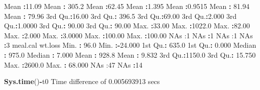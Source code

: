 \documentclass[
]{article}
\newenvironment{Shaded}{\begin{snugshade}}{\end{snugshade}}
\newcommand{\DecValTok}[1]{\textcolor[rgb]{0.00,0.00,0.81}{#1}}
\newcommand{\FloatTok}[1]{\textcolor[rgb]{0.00,0.00,0.81}{#1}}
\newcommand{\FunctionTok}[1]{\textcolor[rgb]{0.13,0.29,0.53}{\textbf{#1}}}
\newcommand{\NormalTok}[1]{#1}
\newcommand{\SpecialCharTok}[1]{\textcolor[rgb]{0.81,0.36,0.00}{\textbf{#1}}}
\newcommand{\StringTok}[1]{\textcolor[rgb]{0.31,0.60,0.02}{#1}}
\begin{document}
\begin{Shaded}
\begin{Highlighting}[]
\NormalTok{ Mean   }\SpecialCharTok{:}\FloatTok{11.09}\NormalTok{   Mean   }\SpecialCharTok{:} \FloatTok{305.2}\NormalTok{   Mean   }\SpecialCharTok{:}\FloatTok{62.45}\NormalTok{   Mean   }\SpecialCharTok{:}\FloatTok{1.395}\NormalTok{   Mean   }\SpecialCharTok{:}\FloatTok{0.9515}\NormalTok{   Mean   }\SpecialCharTok{:} \FloatTok{81.94}\NormalTok{   Mean   }\SpecialCharTok{:} \FloatTok{79.96}  
\NormalTok{ 3rd Qu.}\SpecialCharTok{:}\FloatTok{16.00}\NormalTok{   3rd Qu.}\SpecialCharTok{:} \FloatTok{396.5}\NormalTok{   3rd Qu.}\SpecialCharTok{:}\FloatTok{69.00}\NormalTok{   3rd Qu.}\SpecialCharTok{:}\FloatTok{2.000}\NormalTok{   3rd Qu.}\SpecialCharTok{:}\FloatTok{1.0000}\NormalTok{   3rd Qu.}\SpecialCharTok{:} \FloatTok{90.00}\NormalTok{   3rd Qu.}\SpecialCharTok{:} \FloatTok{90.00}  
\NormalTok{ Max.   }\SpecialCharTok{:}\FloatTok{33.00}\NormalTok{   Max.   }\SpecialCharTok{:}\FloatTok{1022.0}\NormalTok{   Max.   }\SpecialCharTok{:}\FloatTok{82.00}\NormalTok{   Max.   }\SpecialCharTok{:}\FloatTok{2.000}\NormalTok{   Max.   }\SpecialCharTok{:}\FloatTok{3.0000}\NormalTok{   Max.   }\SpecialCharTok{:}\FloatTok{100.00}\NormalTok{   Max.   }\SpecialCharTok{:}\FloatTok{100.00}  
\NormalTok{ NA}\StringTok{\textquotesingle{}s   :1                                                        NA\textquotesingle{}}\NormalTok{s   }\SpecialCharTok{:}\DecValTok{1}\NormalTok{        NA}\StringTok{\textquotesingle{}s   :1        NA\textquotesingle{}}\NormalTok{s   }\SpecialCharTok{:}\DecValTok{3}       
\NormalTok{    meal.cal         wt.loss       }
\NormalTok{ Min.   }\SpecialCharTok{:}  \FloatTok{96.0}\NormalTok{   Min.   }\SpecialCharTok{:{-}}\FloatTok{24.000}  
\NormalTok{ 1st Qu.}\SpecialCharTok{:} \FloatTok{635.0}\NormalTok{   1st Qu.}\SpecialCharTok{:}  \FloatTok{0.000}  
\NormalTok{ Median }\SpecialCharTok{:} \FloatTok{975.0}\NormalTok{   Median }\SpecialCharTok{:}  \FloatTok{7.000}  
\NormalTok{ Mean   }\SpecialCharTok{:} \FloatTok{928.8}\NormalTok{   Mean   }\SpecialCharTok{:}  \FloatTok{9.832}  
\NormalTok{ 3rd Qu.}\SpecialCharTok{:}\FloatTok{1150.0}\NormalTok{   3rd Qu.}\SpecialCharTok{:} \FloatTok{15.750}  
\NormalTok{ Max.   }\SpecialCharTok{:}\FloatTok{2600.0}\NormalTok{   Max.   }\SpecialCharTok{:} \FloatTok{68.000}  
\NormalTok{ NA}\StringTok{\textquotesingle{}s   :47       NA\textquotesingle{}}\NormalTok{s   }\SpecialCharTok{:}\DecValTok{14}       
\end{Highlighting}
\end{Shaded}

\begin{Shaded}
\begin{Highlighting}[]
\FunctionTok{Sys.time}\NormalTok{()}\SpecialCharTok{{-}}\NormalTok{t0}
\NormalTok{Time difference of }\FloatTok{0.005693913}\NormalTok{ secs}
\end{Highlighting}
\end{Shaded}
\end{document}
